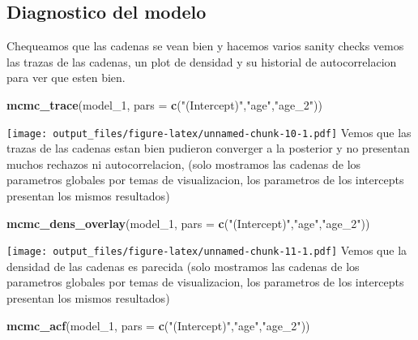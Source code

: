 \documentclass[
]{article}
\newenvironment{Shaded}{\begin{snugshade}}{\end{snugshade}}
\newcommand{\AttributeTok}[1]{\textcolor[rgb]{0.13,0.29,0.53}{#1}}
\newcommand{\FunctionTok}[1]{\textcolor[rgb]{0.13,0.29,0.53}{\textbf{#1}}}
\newcommand{\NormalTok}[1]{#1}
\newcommand{\StringTok}[1]{\textcolor[rgb]{0.31,0.60,0.02}{#1}}
\begin{document}
\subsection{Diagnostico del modelo}\label{diagnostico-del-modelo}

Chequeamos que las cadenas se vean bien y hacemos varios sanity checks
vemos las trazas de las cadenas, un plot de densidad y su historial de
autocorrelacion para ver que esten bien.

\begin{Shaded}
\begin{Highlighting}[]
\FunctionTok{mcmc\_trace}\NormalTok{(model\_1, }\AttributeTok{pars =} \FunctionTok{c}\NormalTok{(}\StringTok{"(Intercept)"}\NormalTok{,}\StringTok{"age"}\NormalTok{,}\StringTok{"age\_2"}\NormalTok{))}
\end{Highlighting}
\end{Shaded}

\texttt{[image: output\_files/figure-latex/unnamed-chunk-10-1.pdf]} Vemos
que las trazas de las cadenas estan bien pudieron converger a la
posterior y no presentan muchos rechazos ni autocorrelacion, (solo
mostramos las cadenas de los parametros globales por temas de
visualizacion, los parametros de los intercepts presentan los mismos
resultados)

\begin{Shaded}
\begin{Highlighting}[]
\FunctionTok{mcmc\_dens\_overlay}\NormalTok{(model\_1, }\AttributeTok{pars =} \FunctionTok{c}\NormalTok{(}\StringTok{"(Intercept)"}\NormalTok{,}\StringTok{"age"}\NormalTok{,}\StringTok{"age\_2"}\NormalTok{))}
\end{Highlighting}
\end{Shaded}

\texttt{[image: output\_files/figure-latex/unnamed-chunk-11-1.pdf]} Vemos
que la densidad de las cadenas es parecida (solo mostramos las cadenas
de los parametros globales por temas de visualizacion, los parametros de
los intercepts presentan los mismos resultados)

\begin{Shaded}
\begin{Highlighting}[]
\FunctionTok{mcmc\_acf}\NormalTok{(model\_1, }\AttributeTok{pars =} \FunctionTok{c}\NormalTok{(}\StringTok{"(Intercept)"}\NormalTok{,}\StringTok{"age"}\NormalTok{,}\StringTok{"age\_2"}\NormalTok{))}
\end{Highlighting}
\end{Shaded}
\end{document}
